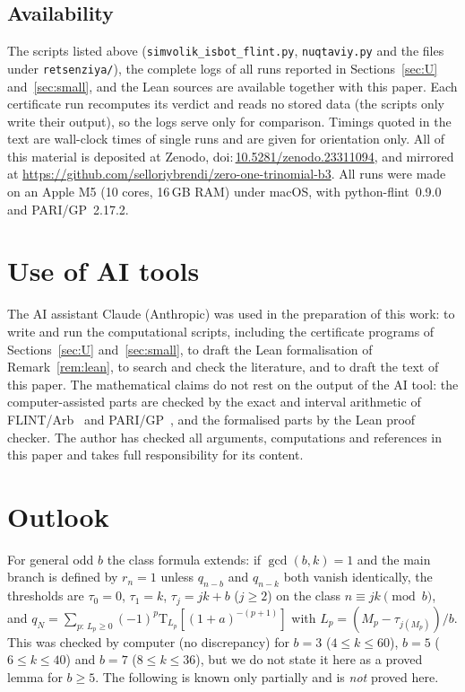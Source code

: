 \documentclass[11pt]{amsart}
\theoremstyle{definition}
\theoremstyle{remark}
\newcommand{\Tr}{\mathrm{T}}
\newcommand{\ZenodoDOI}{\href{https://doi.org/10.5281/zenodo.23311094}{10.5281/zenodo.23311094}}
\begin{document}
\subsection*{Availability}
The scripts listed above (\texttt{simvolik\_isbot\_flint.py}, \texttt{nuqtaviy.py} and
the files under \texttt{retsenziya/}), the complete logs of all runs reported in
Sections~\ref{sec:U} and~\ref{sec:small}, and the Lean sources are
available together with this paper. Each certificate run recomputes its verdict and
reads no stored data (the scripts only write their output), so the logs serve only
for comparison. Timings quoted in the text are wall-clock times of single
runs and are given for orientation only.
All of this material is deposited at Zenodo, doi:\,\ZenodoDOI,
and mirrored at \url{https://github.com/selloriybrendi/zero-one-trinomial-b3}.
All runs were made on an Apple M5 (10 cores, 16\,GB RAM) under macOS, with
python-flint~0.9.0 and PARI/GP~2.17.2.
\par\endgroup

\section*{Use of AI tools}
The AI assistant Claude (Anthropic) was used in the preparation of this work: to
write and run the computational scripts, including the certificate programs of
Sections~\ref{sec:U} and~\ref{sec:small}, to draft the Lean formalisation of
Remark~\ref{rem:lean}, to search and check the literature, and to draft the text of
this paper. The mathematical claims do not rest on the output of the AI tool: the
computer-assisted parts are checked by the exact and interval arithmetic of
FLINT/Arb~\cite{FLINT,Arb} and PARI/GP~\cite{PARI}, and the formalised parts by the
Lean proof checker. The author has checked all arguments, computations and
references in this paper and takes full responsibility for its content.

\section{Outlook}

For general odd $b$ the class formula extends: if $\gcd(b,k)=1$ and the main branch
is defined by $r_n=1$ unless $q_{n-b}$ and $q_{n-k}$ both vanish identically, the
thresholds are $\tau_0=0$, $\tau_1=k$, $\tau_j=jk+b$ ($j\ge 2$) on the class
$n\equiv jk\pmod b$, and $q_N=\sum_{p:\,L_p\ge 0}(-1)^p\Tr_{L_p}[(1+a)^{-(p+1)}]$ with
$L_p=(M_p-\tau_{j(M_p)})/b$. This was checked by computer (no discrepancy) for
$b=3$ ($4\le k\le 60$), $b=5$ ($6\le k\le 40$) and $b=7$ ($8\le k\le 36$), but we do
not state it here as a proved lemma for $b\ge 5$. The following is known only
partially and is \emph{not} proved here.
\end{document}
